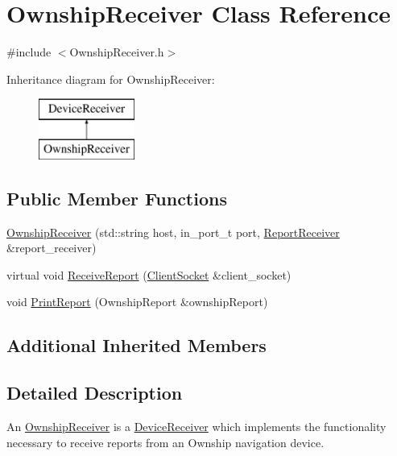 \hypertarget{class_ownship_receiver}{}\section{Ownship\+Receiver Class Reference}
\label{class_ownship_receiver}


{\ttfamily \#include $<$Ownship\+Receiver.\+h$>$}

Inheritance diagram for Ownship\+Receiver\+:\begin{figure}[H]
\begin{center}
\leavevmode
\includegraphics[height=2.000000cm]{class_ownship_receiver}
\end{center}
\end{figure}
\subsection*{Public Member Functions}
\begin{DoxyCompactItemize}
\item 
\hyperlink{class_ownship_receiver_ac784d1c90d44a0fe3ad2b503d9a87c8f}{Ownship\+Receiver} (std\+::string host, in\+\_\+port\+\_\+t port, \hyperlink{class_report_receiver}{Report\+Receiver} \&report\+\_\+receiver)
\item 
virtual void \hyperlink{class_ownship_receiver_ab6bf44b532134a3ba98a2af50871c8f7}{Receive\+Report} (\hyperlink{class_client_socket}{Client\+Socket} \&client\+\_\+socket)
\item 
void \hyperlink{class_ownship_receiver_a4aa935f8a765ff652b4faf34be04c7ff}{Print\+Report} (Ownship\+Report \&ownship\+Report)
\end{DoxyCompactItemize}
\subsection*{Additional Inherited Members}


\subsection{Detailed Description}
An \hyperlink{class_ownship_receiver}{Ownship\+Receiver} is a \hyperlink{class_device_receiver}{Device\+Receiver} which implements the functionality necessary to receive reports from an Ownship navigation device. 

